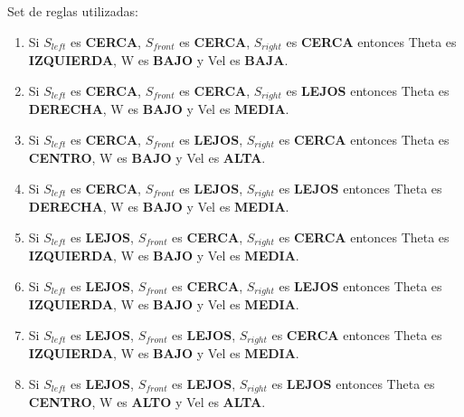Set de reglas utilizadas:
\begin{enumerate}
    \item Si $S_{left}$ es \textbf{CERCA}, $S_{front}$ es \textbf{CERCA}, $S_{right}$ es \textbf{CERCA} entonces Theta es \textbf{IZQUIERDA}, W es \textbf{BAJO} y Vel es \textbf{BAJA}.
    \item Si $S_{left}$ es \textbf{CERCA}, $S_{front}$ es \textbf{CERCA}, $S_{right}$ es \textbf{LEJOS} entonces Theta es \textbf{DERECHA}, W es \textbf{BAJO} y Vel es \textbf{MEDIA}.
    \item Si $S_{left}$ es \textbf{CERCA}, $S_{front}$ es \textbf{LEJOS}, $S_{right}$ es \textbf{CERCA} entonces Theta es \textbf{CENTRO}, W es \textbf{BAJO} y Vel es \textbf{ALTA}.
    \item Si $S_{left}$ es \textbf{CERCA}, $S_{front}$ es \textbf{LEJOS}, $S_{right}$ es \textbf{LEJOS} entonces Theta es \textbf{DERECHA}, W es \textbf{BAJO} y Vel es \textbf{MEDIA}.
    \item Si $S_{left}$ es \textbf{LEJOS}, $S_{front}$ es \textbf{CERCA}, $S_{right}$ es \textbf{CERCA} entonces Theta es \textbf{IZQUIERDA}, W es \textbf{BAJO} y Vel es \textbf{MEDIA}.
    \item Si $S_{left}$ es \textbf{LEJOS}, $S_{front}$ es \textbf{CERCA}, $S_{right}$ es \textbf{LEJOS} entonces Theta es \textbf{IZQUIERDA}, W es \textbf{BAJO} y Vel es \textbf{MEDIA}.
    \item Si $S_{left}$ es \textbf{LEJOS}, $S_{front}$ es \textbf{LEJOS}, $S_{right}$ es \textbf{CERCA} entonces Theta es \textbf{IZQUIERDA}, W es \textbf{BAJO} y Vel es \textbf{MEDIA}.
    \item Si $S_{left}$ es \textbf{LEJOS}, $S_{front}$ es \textbf{LEJOS}, $S_{right}$ es \textbf{LEJOS} entonces Theta es \textbf{CENTRO}, W es \textbf{ALTO} y Vel es \textbf{ALTA}.
\end{enumerate}